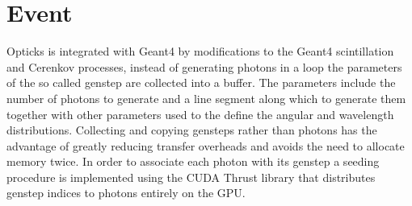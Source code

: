 \documentclass[a4paper]{jpconf}
\begin{document}
%
%
% 
% 
% 


\section{Event}

Opticks is integrated with Geant4 by modifications to the 
Geant4 scintillation and Cerenkov processes, instead of 
generating photons in a loop the parameters of the so called genstep 
are collected into a buffer. 
The parameters include the number of photons to generate and a line segment 
along which to generate them together with other parameters used to the 
define the angular and wavelength distributions.
%
Collecting and copying gensteps rather than photons has the
advantage of greatly reducing transfer overheads and avoids the 
need to allocate memory twice.
In order to associate each photon with its genstep a seeding 
procedure is implemented using the CUDA Thrust\cite{thrust}\cite{thrustURL} 
library that distributes genstep indices to photons entirely on the GPU.
\end{document}
